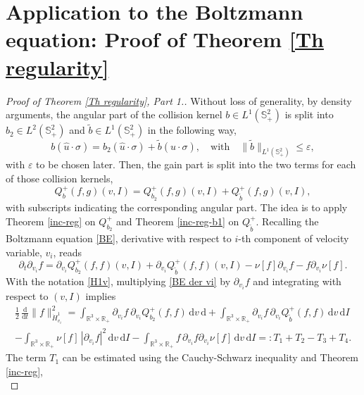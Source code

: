 \documentclass[11pt,a4paper]{amsart}
\newcommand{\bRp}{\mathbb{R}_+}
\newcommand{\bRfp}{\mathbb{R}^3 \times \bRp}
\newcommand{\bSp}{\mathbb{S}^2_+}
\newcommand{\md}{\mathrm{d}}
\begin{document}
\section{Application to the Boltzmann equation: Proof of Theorem \ref{Th regularity}}\label{Sec: proof reg}

\begin{proof}[Proof of Theorem \ref{Th regularity}, Part 1.]
Without loss of generality, by density arguments, 
the angular part of the collision kernel $b \in L^1(\bSp)$ is split into $b_2 \in L^2(\bSp)$ and $\tilde{b} \in L^1(\bSp)$ in the following way,
\begin{equation}
b(\hat{u}\cdot\sigma) = b_2(\hat{u}\cdot\sigma)  + \tilde{b}(\hat{u}\cdot\sigma), \quad \text{with} \quad  \|\tilde{b}\|_{L^1(\bSp)} \leq \varepsilon,
\end{equation}
with $\varepsilon$ to be chosen later. Then, the gain part is split into the two terms for each of those collision kernels,
\begin{equation}
	Q_b^+(f,g)(v,I) = Q_{b_2}^+(f,g)(v,I)   + Q_{\tilde{b}}^+(f,g)(v,I),
\end{equation}
with subscripts indicating the corresponding angular part. The idea is to apply Theorem \ref{inc-reg} on $Q_{b_2}^+$ and Theorem \ref{inc-reg-b1} on $Q_{\tilde{b}}^+$. Recalling the Boltzmann equation \eqref{BE}, 
derivative 
with respect to $i$-th component of velocity variable, $v_i$,  reads
\begin{equation}\label{BE der vi}
\partial_t \partial_{v_i} f = \partial_{v_i} Q_{b_2}^+(f,f)(v,I)  +  \partial_{v_i} Q_{\tilde{b}}^+(f,f)(v,I) - 	\nu[f] \partial_{v_i} f  - f \partial_{v_i} 	\nu[f].
\end{equation}
With the notation \eqref{H1v}, multiplying \eqref{BE der vi} by $\partial_{v_i} f$ and integrating with respect to  $(v,I) $ implies
\begin{multline*}
\frac{1}{2} \,\frac{\md}{\md t}\| f \|_{\dot{H}^{1}_{v_i}}^2 = 	\int_{ \bRfp } \partial_{v_i} f \  \partial_{v_i} Q_{b_2}^+(f,f)  \, \md v \, \md
+   	\int_{ \bRfp } \partial_{v_i} f\, \partial_{v_i} Q_{\tilde{b}}^+(f,f) \, \md v \, \md I
\\ - 	\int_{ \bRfp }	\nu[f] \, |\partial_{v_i} f|^2 \, \md v \, \md I
  -  	\int_{ \bRfp } f \, \partial_{v_i}  f \partial_{v_i} 	\nu[f]  \, \md v \, \md I
 =: T_1 + T_2 - T_3 + T_4.
\end{multline*}
The term $T_1$ can be estimated using the Cauchy-Schwarz inequality and Theorem \ref{inc-reg},
\begin{equation*}

\end{equation*}
\end{proof}
\end{document}

